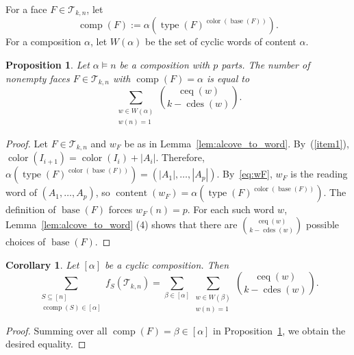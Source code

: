 \documentclass[12pt,reqno]{amsart}
\theoremstyle{plain}
\newtheorem{proposition}[theorem]{Proposition}
\newtheorem{corollary}[theorem]{Corollary}
\theoremstyle{definition}
\newcommand{\Tri}{\mathcal{T}_{k,n}}
\DeclareMathOperator{\typ}{type}
\DeclareMathOperator{\comp}{comp}
\DeclareMathOperator{\ccomp}{ccomp}
\DeclareMathOperator{\base}{base}
\DeclareMathOperator{\col}{color}
\DeclareMathOperator{\cdes}{cdes}
\DeclareMathOperator{\ceq}{ceq}
\DeclareMathOperator{\content}{content}
\begin{document}
For a face $ F \in \Tri $, let
\begin{equation}
	\comp(F):= \alpha(\typ(F)^{\col(\base(F))}).
\end{equation}
For a composition $\alpha$, let $W(\alpha)$ be the set of cyclic words of content $\alpha$.

\begin{proposition}\label{prop:compF}
	Let $ \alpha \models n $
	be a composition with $ p $ parts. The number of nonempty faces $ F \in \Tri $ with $ \comp(F) = \alpha $ is equal to
	\begin{equation}\label{eq:Nalpha}
		\sum_{\substack{w \in W(\alpha) \\ w(n) = 1}} \binom{\ceq(w)}{k - \cdes(w)}.
	\end{equation}
\end{proposition}

\begin{proof}
	Let $ F \in \Tri $ and $ w_F $
	be as in Lemma~\ref{lem:alcove_to_word}. By~(\ref{item1}), $
		\col(I_{i+1}) = \col(I_i) + |A_i| $. Therefore, $
		\alpha(\typ(F)^{\col(\base(F))}) = (|A_1|,\dots,|A_p|) $. By~\eqref{eq:wF}, $ w_F $
	is the reading word of $ (A_1,\dots,A_p) $, so $
		\content(w_F) = \alpha(\typ(F)^{\col(\base(F))}) $. The definition of $ \base(F) $ forces $ w_F(n) = p $. For each such word $w$, Lemma~\ref{lem:alcove_to_word} (4) shows that there are $\binom{\ceq(w)}{k - \cdes(w)}$ possible choices of $\base(F)$.
\end{proof}

\begin{corollary}
	Let $ [\alpha] $ be a cyclic composition. Then
	\begin{equation}
		\sum_{\substack{S \subseteq [n] \\ \ccomp(S) \in [\alpha]}} f_S(\Tri) = \sum_{\beta \in [\alpha]} \sum_{\substack{w \in W(\beta) \\ w(n) = 1}} \binom{\ceq(w)}{k - \cdes(w)}.
	\end{equation}
\end{corollary}
\begin{proof}
	Summing over all $\comp(F) = \beta \in [\alpha]$ in Proposition~\ref{prop:compF}, we obtain the desired equality.
\end{proof}
\end{document}
